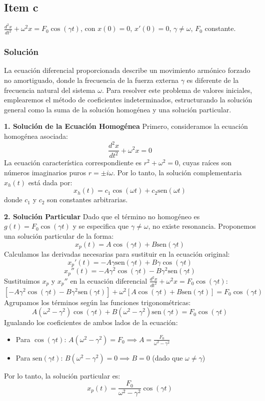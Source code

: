 \documentclass[a4paper]{article}
\begin{document}
\subsection{Item c}
$\frac{d^2 x}{dt^2} + \omega^2 x = F_0 \cos(\gamma t)$, con $x(0)= 0$, $x'(0)= 0$, $\gamma \neq \omega$, $F_0$ constante.

\subsubsection{Solución}
La ecuación diferencial proporcionada describe un movimiento armónico forzado no amortiguado, donde la frecuencia de la fuerza externa $\gamma$ es diferente de la frecuencia natural del sistema $\omega$. Para resolver este problema de valores iniciales, emplearemos el método de coeficientes indeterminados, estructurando la solución general como la suma de la solución homogénea y una solución particular.

\textbf{1. Solución de la Ecuación Homogénea}
Primero, consideramos la ecuación homogénea asociada:
$$
\frac{d^2 x}{dt^2} + \omega^2 x = 0
$$
La ecuación característica correspondiente es $r^2 + \omega^2 = 0$, cuyas raíces son números imaginarios puros $r = \pm i\omega$. Por lo tanto, la solución complementaria $x_h(t)$ está dada por:
$$
x_h(t) = c_1 \cos(\omega t) + c_2 \text{sen}(\omega t)
$$
donde $c_1$ y $c_2$ son constantes arbitrarias.

\textbf{2. Solución Particular}
Dado que el término no homogéneo es $g(t) = F_0 \cos(\gamma t)$ y se especifica que $\gamma \neq \omega$, no existe resonancia. Proponemos una solución particular de la forma:
$$
x_p(t) = A \cos(\gamma t) + B \text{sen}(\gamma t)
$$
Calculamos las derivadas necesarias para sustituir en la ecuación original:
$$
x_p'(t) = -A\gamma \text{sen}(\gamma t) + B\gamma \cos(\gamma t)
$$
$$
x_p''(t) = -A\gamma^2 \cos(\gamma t) - B\gamma^2 \text{sen}(\gamma t)
$$
Sustituimos $x_p$ y $x_p''$ en la ecuación diferencial $\frac{d^2 x}{dt^2} + \omega^2 x = F_0 \cos(\gamma t)$:
$$
[-A\gamma^2 \cos(\gamma t) - B\gamma^2 \text{sen}(\gamma t)] + \omega^2 [A \cos(\gamma t) + B \text{sen}(\gamma t)] = F_0 \cos(\gamma t)
$$
Agrupamos los términos según las funciones trigonométricas:
$$
A(\omega^2 - \gamma^2) \cos(\gamma t) + B(\omega^2 - \gamma^2) \text{sen}(\gamma t) = F_0 \cos(\gamma t)
$$
Igualando los coeficientes de ambos lados de la ecuación:
\begin{itemize}
    \item Para $\cos(\gamma t)$: $A(\omega^2 - \gamma^2) = F_0 \implies A = \frac{F_0}{\omega^2 - \gamma^2}$
    \item Para $\text{sen}(\gamma t)$: $B(\omega^2 - \gamma^2) = 0 \implies B = 0$ (dado que $\omega \neq \gamma$)
\end{itemize}
Por lo tanto, la solución particular es:
$$
x_p(t) = \frac{F_0}{\omega^2 - \gamma^2} \cos(\gamma t)
$$
\end{document}
